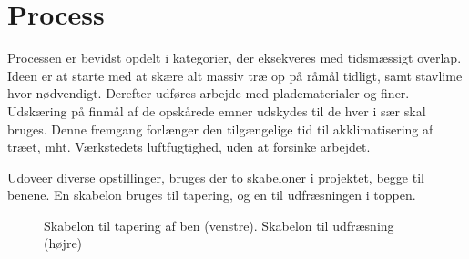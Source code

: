 \section*{Process}
Processen er bevidst opdelt i kategorier, der eksekveres med tidsmæssigt
overlap. Ideen er at starte med at skære alt massiv træ op på råmål tidligt,
samt stavlime hvor nødvendigt. Derefter udføres arbejde med pladematerialer og
finer. Udskæring på finmål af de opskårede emner udskydes til de hver i sær skal
bruges. Denne fremgang forlænger den tilgængelige tid til akklimatisering af
træet, mht. Værkstedets luftfugtighed, uden at forsinke arbejdet.

Udoveer diverse opstillinger, bruges der to skabeloner i projektet, begge til
benene. En skabelon bruges til tapering, og en til udfræsningen i toppen.

\begin{figure}[htb]
\centering
{}
\caption{Skabelon til tapering af ben (venstre). Skabelon til udfræsning (højre)}
\end{figure}

